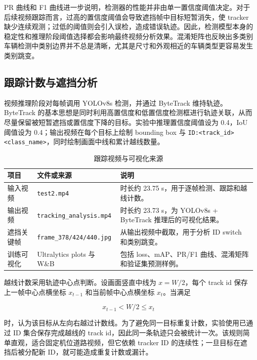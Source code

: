 \documentclass[UTF8,a4paper,11pt]{ctexart}
\newcommand{\code}[1]{\texttt{#1}}
\begin{document}
PR 曲线和 F1 曲线进一步说明，检测器的性能并非由单一置信度阈值决定。对于后续视频跟踪而言，过高的置信度阈值会导致遮挡帧中目标短暂消失，使 tracker 缺少连续观测；过低的阈值则会引入误检，造成错误轨迹。因此，检测模型本身的稳定性和推理阶段阈值选择都会影响最终视频分析效果。混淆矩阵也反映出多类别车辆检测中类别边界并不总是清晰，尤其是尺寸和外观相近的车辆类型更容易发生类别跳变。

\subsection{跟踪计数与遮挡分析}

视频推理阶段对每帧调用 YOLOv8s 检测，并通过 ByteTrack 维持轨迹。ByteTrack 的基本思想是同时利用高置信度和低置信度检测框进行轨迹关联，从而尽量保留被短暂遮挡或置信度下降的目标。实验中推理置信度阈值设为 0.4，IoU 阈值设为 0.4；输出视频在每个目标上绘制 bounding box 与 \code{ID:<track\_id> <class\_name>}，同时绘制画面中线和累计越线数量。

\begin{table}[H]
    \centering
    \caption{跟踪视频与可视化来源}
    \small
    \begin{tabularx}{\textwidth}{llX}
        \toprule
        项目 & 文件或来源 & 说明 \\
        \midrule
        输入视频 & \code{test2.mp4} & 时长约 23.75 s，用于逐帧检测、跟踪和越线计数。 \\
        输出视频 & \code{tracking\_analysis.mp4} & 时长约 23.73 s，为 YOLOv8s + ByteTrack 推理后的可视化结果。 \\
        遮挡关键帧 & \code{frame\_378/424/440.jpg} & 从输出视频中截取，用于分析 ID switch 和类别跳变。 \\
        训练可视化 & Ultralytics plots 与 W\&B & 包括 loss、mAP、PR/F1 曲线、混淆矩阵和验证集预测样例。 \\
        \bottomrule
    \end{tabularx}
\end{table}

越线计数采用轨迹中心点判断。设画面竖直中线为 \(x = W/2\)，每个 track id 保存上一帧中心点横坐标 \(x_{t-1}\) 和当前帧中心点横坐标 \(x_t\)。当满足

\begin{equation}
    x_{t-1} < W/2 \leq x_t
\end{equation}

时，认为该目标从左向右越过计数线。为了避免同一目标重复计数，实验使用已通过 ID 集合保存完成越线的 track id，因此同一条轨迹只会被统计一次。该规则简单直观，适合固定机位道路视频，但它依赖 tracker ID 的连续性；一旦目标在遮挡后被分配新 ID，就可能造成重复计数或漏计。
\end{document}
